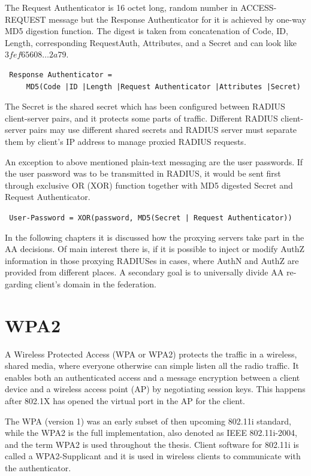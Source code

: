 \documentclass[12pt,a4paper,english]{tutthesis}
\begin{document}
\begin{otherlanguage}{english}
The Request Authenticator is 16 octet long, random number in
ACCESS-REQUEST message but the Response Authenticator for it is achieved
by one-way MD5 digestion function. 
The digest is taken from concatenation of Code, ID, Length, corresponding
Request\-Auth, Attributes, and a Secret and can look like 
$3fef65608\ldots 2a79$. 
\begin{verbatim}
 Response Authenticator = 
     MD5(Code |ID |Length |Request Authenticator |Attributes |Secret)
\end{verbatim}
The Secret is the shared secret which has been configured between
RADIUS client-server pairs,
and it protects some parts of traffic. 
Different RADIUS client-server pairs may use different
shared secrets and RADIUS server must separate them by client's IP address to
manage proxied RADIUS requests\cite{radiusbook}.

An exception to above mentioned plain-text messaging are the user passwords.
If the user password was to be transmitted in RADIUS, it would be sent first
through exclusive OR (XOR) function together with MD5 digested Secret
and Request Authenticator.
\begin{center}
{\tt 
User-Password = XOR(password, MD5(Secret | Request Authenticator))}
\end{center}




In the following chapters it is discussed how the proxying servers take 
part in the AA decisions. Of main interest there is, if it is possible 
to inject or modify AuthZ information in those proxying RADIUSes in
cases, where AuthN and AuthZ are provided from different
 places\cite{rfc2607}. A secondary goal is to universally divide AA regarding 
client's domain in the federation.




\section{WPA2}
\label{sec-2-3}

A Wireless Protected Access (WPA or WPA2) protects the traffic in a wireless,
shared media, where everyone otherwise can simple listen all the radio traffic.
It enables both an authenticated access and a message
encryption between a client device and  a wireless access point (AP)
by negotiating session keys. This happens 
after 802.1X has opened the virtual port in the AP for the client.

The WPA (version 1)  was an early subset of then upcoming 802.11i standard,
while the WPA2 is the full implementation, also denoted as IEEE
802.11i-2004, and the term WPA2 is used throughout the thesis.
Client software for 802.11i is called a WPA2-Supplicant and it is used
in wireless clients to communicate with the authenticator. 


\end{otherlanguage}
\end{document}
